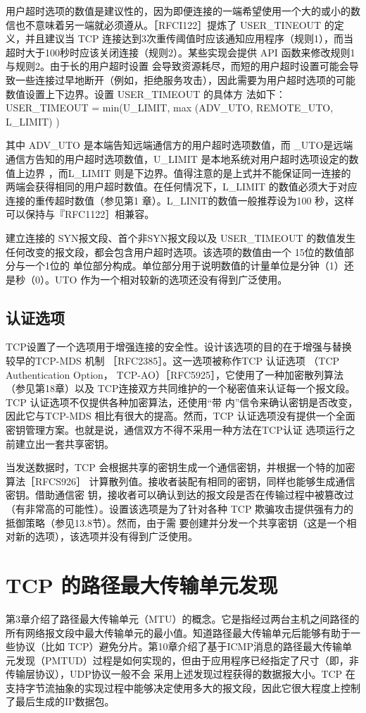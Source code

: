 用户超时选项的数值是建议性的，因为即便连接的一端希望使用一个大的或小的数信也不意味着另一端就必须遵从。［RFCI122］提炼了 USER\_TINEOUT 的定义，并且建议当
TCP 连接达到3次重传阈值时应该通知应用程序（规则1），而当超时大于100秒时应该关闭连接（规则2）。某些实现会提供 API 函数来修改规则1与规则2。由于长的用户超时设置
会导致资源耗尽，而短的用户超时设置可能会导致一些连接过早地断开（例如，拒绝服务攻击），因此需要为用户超时选项的可能数值设置上下边界。设置 USER\_TIMEOUT 的具体方
法如下：
USER\_TIMEOUT = min(U\_LIMIT, max (ADV\_UTO, REMOTE\_UTO, L\_LIMIT) )

其中 ADV\_UTO 是本端告知远端通信方的用户超时选项数值，而 \_UTO是远端通信方告知的用户超时选项数值，U\_LIMIT 是本地系统对用户超时选项设定的数值上边界
，而L\_LIMIT 则是下边界。值得注意的是上式并不能保证同一连接的两端会获得相同的用户超时数值。在任何情况下，L\_LIMIT 的数值必须大于对应连接的重传超时数值（参见第1
章）。L\_LINIT的数值一般推荐设为100 秒，这样可以保持与『RFC1122］相兼容。

建立连接的 SYN报文段、首个非SYN报文段以及 USER\_TIMEOUT 的数值发生任何改变的报文段，都会包含用户超时选项。该选项的数值由一个 15位的数值部分与一个1位的
单位部分构成。单位部分用于说明数值的计量单位是分钟（1）还是秒（0）。UTO 作为一个相对较新的选项还没有得到广泛使用。

\subsection{认证选项}
TCP设置了一个选项用于增强连接的安全性。设计该选项的目的在于增强与替换较早的TCP-MDS 机制 ［RFC2385］。这一选项被称作TCP 认证选项 （TCP Authentication Option，
TCP-AO）［RFC5925］，它使用了一种加密散列算法（参见第18章）以及 TCP连接双方共同维护的一个秘密值来认证每一个报文段。TCP 认证选项不仅提供各种加密算法，还使用“带
内”信令来确认密钥是否改变，因此它与TCP-MDS 相比有很大的提高。然而，TCP 认证选项没有提供一个全面密钥管理方案。也就是说，通信双方不得不采用一种方法在TCP认证
选项运行之前建立出一套共享密钥。

当发送数据时，TCP 会根据共享的密钥生成一个通信密钥，并根据一个特的加密算法［RFCS926］ 计算散列值。接收者装配有相同的密钥，同样也能够生成通信密钥。借助通信密
钥，接收者可以确认到达的报文段是否在传输过程中被篡改过（有非常高的可能性）。设置该选项是为了针对各种 TCP 欺骗攻击提供强有力的抵御策略（参见13.8节）。然而，由于需
要创建并分发一个共享密钥（这是一个相对新的选项），该选项并没有得到广泛使用。
\section{TCP 的路径最大传输单元发现}
第3章介绍了路径最大传输单元（MTU）的概念。它是指经过两台主机之间路径的所有网络报文段中最大传输单元的最小值。知道路径最大传输单元后能够有助于一些协议（比如
TCP）避免分片。第10章介绍了基于ICMP消息的路径最大传输单元发现（PMTUD）过程是如何实现的，但由于应用程序已经指定了尺寸（即，非传输层协议），UDP协议一般不会
采用上述发现过程获得的数据报大小。TCP 在支持字节流抽象的实现过程中能够决定使用多大的报文段，因此它很大程度上控制了最后生成的IP数据包。

